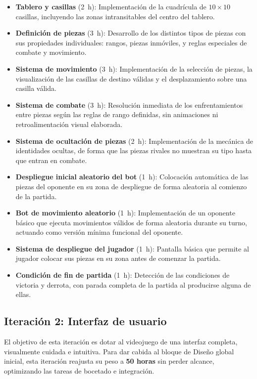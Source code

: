 \begin{itemize}
	\item \textbf{Tablero y casillas} (2~h): Implementación de la cuadrícula de $10\times10$ casillas, incluyendo las zonas intransitables del centro del tablero.
	\item \textbf{Definición de piezas} (3~h): Desarrollo de los distintos tipos de piezas con sus propiedades individuales: rangos, piezas inmóviles, y reglas especiales de combate y movimiento.
	\item \textbf{Sistema de movimiento} (3~h): Implementación de la selección de piezas, la visualización de las casillas de destino válidas y el desplazamiento sobre una casilla válida.
	\item \textbf{Sistema de combate} (3~h): Resolución inmediata de los enfrentamientos entre piezas según las reglas de rango definidas, sin animaciones ni retroalimentación visual elaborada.
	\item \textbf{Sistema de ocultación de piezas} (2~h): Implementación de la mecánica de identidades ocultas, de forma que las piezas rivales no muestran su tipo hasta que entran en combate.
	\item \textbf{Despliegue inicial aleatorio del bot} (1~h): Colocación automática de las piezas del oponente en su zona de despliegue de forma aleatoria al comienzo de la partida.
	\item \textbf{Bot de movimiento aleatorio} (1~h): Implementación de un oponente básico que ejecuta movimientos válidos de forma aleatoria durante su turno, actuando como versión mínima funcional del oponente.
	\item \textbf{Sistema de despliegue del jugador} (1~h): Pantalla básica que permite al jugador colocar sus piezas en su zona antes de comenzar la partida.
	\item \textbf{Condición de fin de partida} (1~h): Detección de las condiciones de victoria y derrota, con parada completa de la partida al producirse alguna de ellas.
\end{itemize}

\subsection{Iteración 2: Interfaz de usuario}

El objetivo de esta iteración es dotar al videojuego de una interfaz completa, visualmente cuidada e intuitiva. Para dar cabida al bloque de Diseño global inicial, esta iteración reajusta su peso a \textbf{50 horas} sin perder alcance, optimizando las tareas de bocetado e integración.


